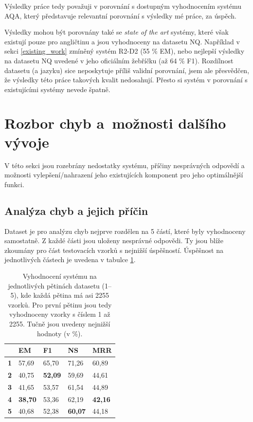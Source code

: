 Výsledky práce tedy považuji v porovnání s dostupným vyhodnocením systému AQA, který představuje relevantní porovnání s výsledky mé práce, za úspěch.\par
Výsledky mohou být porovnány také se \textit{state of the art} systémy, které však existují pouze pro angličtinu a jsou vyhodnoceny na datasetu NQ. Například v sekci \ref{existing_work} zmíněný systém R2-D2 (55 \% EM), nebo nejlepší výsledky na datasetu NQ uvedené v jeho oficiálním žebříčku (až 64 \% F1). Rozdílnost datasetu (a jazyku) sice neposkytuje příliš validní porovnání, jsem ale přesvědčen, že výsledky této práce takových kvalit nedosahují. Přesto si systém v porovnání s existujícími systémy nevede špatně.


\section{Rozbor chyb a~možnosti dalšího vývoje}
V této sekci jsou rozebrány nedostatky systému, příčiny nesprávných odpovědí a možnosti vylepšení/nahrazení jeho existujících komponent pro jeho optimálnější funkci.\par
\subsection{Analýza chyb a jejich příčin}
Dataset je pro analýzu chyb nejprve rozdělen na 5 částí, které byly vyhodnoceny samostatně. Z každé části jsou uloženy nesprávné odpovědi. Ty jsou blíže zkoumány pro část testovacích vzorků s nejnižší úspěšností. Úspěšnost na jednotlivých částech je uvedena v tabulce \ref{tab:partial_eval}.

\begin{table}[H]
\centering
\begin{tabular}{|l|l|l|l|l|}
\hline
           & \textbf{EM} & \textbf{F1} & \textbf{NS} & \textbf{MRR} \\ \hline
\textbf{1} & 57,69       & 65,70       & 71,26       & 60,89        \\ \hline
\textbf{2} & 40,75       & \textbf{52,09}       & 59,69       & 44,61        \\ \hline
\textbf{3} & 41,65       & 53,57       & 61,54       & 44,89        \\ \hline
\textbf{4} & \textbf{38,70}       & 53,36       & 62,19       & \textbf{42,16}        \\ \hline
\textbf{5} & 40,68       & 52,38       & \textbf{60,07}       & 44,18        \\ \hline
\end{tabular}
\caption{Vyhodnocení systému na jednotlivých pětinách datasetu (1--5), kde každá pětina má asi 2255 vzorků. Pro první pětinu jsou tedy vyhodnoceny vzorky s číslem 1 až 2255. Tučně jsou uvedeny nejnižší hodnoty (v \%).}
\label{tab:partial_eval}
\end{table}

